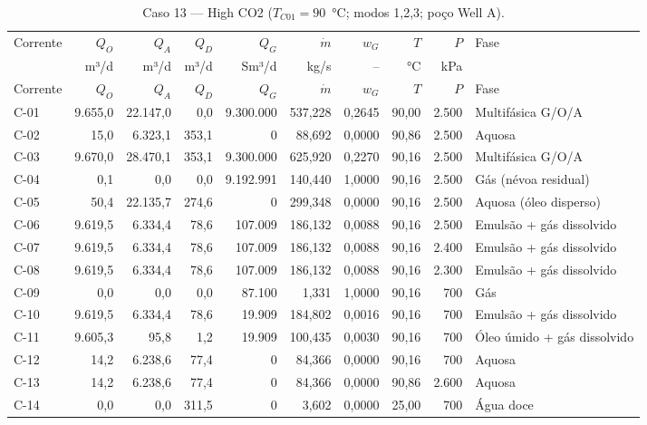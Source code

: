 \documentclass[11pt,a4paper]{article}
\numberwithin{equation}{section}
\numberwithin{table}{section}
\numberwithin{figure}{section}
\begin{document}
{\footnotesize\setlength{\tabcolsep}{3pt}\begin{longtable}{lrrrrrrrrL{2.5cm}}
\caption{Caso 13 --- High CO2 ($T_{C01}=90$~°C; modos 1,2,3; poço Well A).}\\\toprule
Corrente & $Q_O$ & $Q_A$ & $Q_D$ & $Q_G$ & $\dot m$ & $w_G$ & $T$ & $P$ & Fase\\ & m³/d & m³/d & m³/d & Sm³/d & kg/s & -- & °C & kPa & \\\midrule\endfirsthead
\toprule Corrente & $Q_O$ & $Q_A$ & $Q_D$ & $Q_G$ & $\dot m$ & $w_G$ & $T$ & $P$ & Fase\\\midrule\endhead
C-01 & 9.655,0 & 22.147,0 & 0,0 & 9.300.000 & 537,228 & 0,2645 & 90,00 & 2.500 & {\scriptsize Multifásica G/O/A}\\
C-02 & 15,0 & 6.323,1 & 353,1 & 0 & 88,692 & 0,0000 & 90,86 & 2.500 & {\scriptsize Aquosa}\\
C-03 & 9.670,0 & 28.470,1 & 353,1 & 9.300.000 & 625,920 & 0,2270 & 90,16 & 2.500 & {\scriptsize Multifásica G/O/A}\\
C-04 & 0,1 & 0,0 & 0,0 & 9.192.991 & 140,440 & 1,0000 & 90,16 & 2.500 & {\scriptsize Gás (névoa residual)}\\
C-05 & 50,4 & 22.135,7 & 274,6 & 0 & 299,348 & 0,0000 & 90,16 & 2.500 & {\scriptsize Aquosa (óleo disperso)}\\
C-06 & 9.619,5 & 6.334,4 & 78,6 & 107.009 & 186,132 & 0,0088 & 90,16 & 2.500 & {\scriptsize Emulsão + gás dissolvido}\\
C-07 & 9.619,5 & 6.334,4 & 78,6 & 107.009 & 186,132 & 0,0088 & 90,16 & 2.400 & {\scriptsize Emulsão + gás dissolvido}\\
C-08 & 9.619,5 & 6.334,4 & 78,6 & 107.009 & 186,132 & 0,0088 & 90,16 & 2.300 & {\scriptsize Emulsão + gás dissolvido}\\
C-09 & 0,0 & 0,0 & 0,0 & 87.100 & 1,331 & 1,0000 & 90,16 & 700 & {\scriptsize Gás}\\
C-10 & 9.619,5 & 6.334,4 & 78,6 & 19.909 & 184,802 & 0,0016 & 90,16 & 700 & {\scriptsize Emulsão + gás dissolvido}\\
C-11 & 9.605,3 & 95,8 & 1,2 & 19.909 & 100,435 & 0,0030 & 90,16 & 700 & {\scriptsize Óleo úmido + gás dissolvido}\\
C-12 & 14,2 & 6.238,6 & 77,4 & 0 & 84,366 & 0,0000 & 90,16 & 700 & {\scriptsize Aquosa}\\
C-13 & 14,2 & 6.238,6 & 77,4 & 0 & 84,366 & 0,0000 & 90,86 & 2.600 & {\scriptsize Aquosa}\\
C-14 & 0,0 & 0,0 & 311,5 & 0 & 3,602 & 0,0000 & 25,00 & 700 & {\scriptsize Água doce}\\

\end{longtable}}
\end{document}
